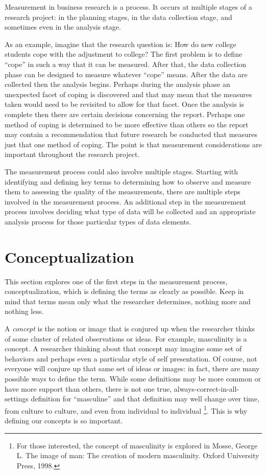Measurement in business research is a process. It occurs at multiple stages of a research project: in the planning stages, in the data collection stage, and sometimes even in the analysis stage. 

As an example, imagine that the research question is: How do new college students cope with the adjustment to college? The first problem is to define ``cope'' in such a way that it can be measured. After that, the data collection phase can be designed to measure whatever ``cope'' means. After the data are collected then the analysis begins. Perhaps during the analysis phase an unexpected facet of coping is discovered and that may mean that the measures taken would need to be revisited to allow for that facet. Once the analysis is complete then there are certain decisions concerning the report. Perhaps one method of coping is determined to be more effective than others so the report may contain a recommendation that future research be conducted that measures just that one method of coping. The point is that measurement considerations are important throughout the research project.

The measurement process could also involve multiple stages. Starting with identifying and defining key terms to determining how to observe and measure them to assessing the quality of the measurements, there are multiple steps involved in the measurement process. An additional step in the measurement process involves deciding what type of data will be collected and an appropriate analysis process for those particular types of data elements. 

\section{Conceptualization}

This section explores one of the first steps in the measurement process, conceptualization, which is defining the terms as clearly as possible. Keep in mind that terms mean only what the researcher determines, nothing more and nothing less.

A \textit{concept} is the notion or image that is conjured up when the researcher thinks of some cluster of related observations or ideas. For example, masculinity is a concept. A researcher thinking about that concept may imagine some set of behaviors and perhaps even a particular style of self presentation. Of course, not everyone will conjure up that same set of ideas or images: in fact, there are many possible ways to define the term. While some definitions may be more common or have more support than others, there is not one true, always-correct-in-all-settings definition for ``masculine'' and that definition may well change over time, from culture to culture, and even from individual to individual \footnote{For those interested, the concept of masculinity is explored in Mosse, George L. The image of man: The creation of modern masculinity. Oxford University Press, 1998.}. This is why defining our concepts is so important.

